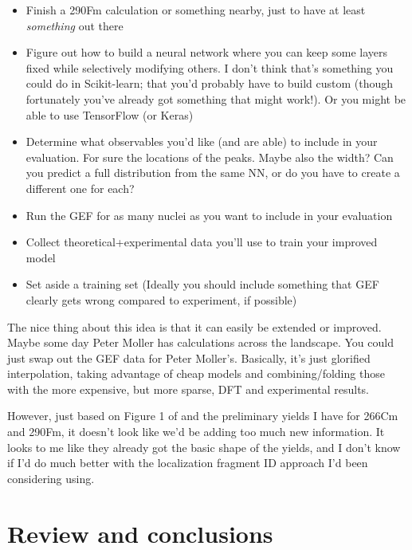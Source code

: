 \begin{itemize}
	\item Finish a 290Fm calculation or something nearby, just to have at least \textit{something} out there
	\item Figure out how to build a neural network where you can keep some layers fixed while selectively modifying others. I don't think that's something you could do in Scikit-learn; that you'd probably have to build custom (though fortunately you've already got something that might work!). Or you might be able to use TensorFlow (or Keras)
	\item Determine what observables you'd like (and are able) to include in your evaluation. For sure the locations of the peaks. Maybe also the width? Can you predict a full distribution from the same NN, or do you have to create a different one for each?
	\item Run the GEF for as many nuclei as you want to include in your evaluation
	\item Collect theoretical+experimental data you'll use to train your improved model
	\item Set aside a training set (Ideally you should include something that GEF clearly gets wrong compared to experiment, if possible)
\end{itemize}

The nice thing about this idea is that it can easily be extended or improved. Maybe some day Peter Moller has calculations across the landscape. You could just swap out the GEF data for Peter Moller's. Basically, it's just glorified interpolation, taking advantage of cheap models and combining/folding those with the more expensive, but more sparse, DFT and experimental results.

However, just based on Figure 1 of \cite{Vassh2018} and the preliminary yields I have for 266Cm and 290Fm, it doesn't look like we'd be adding too much new information. It looks to me like they already got the basic shape of the yields, and I don't know if I'd do much better with the localization fragment ID approach I'd been considering using.

\section{Review and conclusions}
